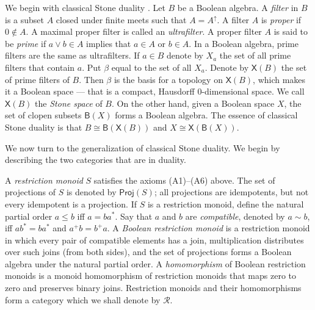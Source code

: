 \documentclass[a4paper]{amsart}
\begin{document}
We begin with classical Stone duality \cite{BS}.
Let $B$ be a Boolean algebra.
A {\em filter} in $B$ is a subset $A$ closed under finite meets such that $A = A^{\uparrow}$.
A filter $A$ is {\em proper} if $0 \notin A$.
A maximal proper filter is called an {\em ultrafilter}.
A proper filter $A$ is said to be {\em prime} if $a \vee b \in A$ implies that $a \in A$ or $b \in A$.
In a Boolean algebra, prime filters are the same as ultrafilters.
If $a \in B$ denote by $X_{a}$ the set of all prime filters that contain $a$.
Put $\beta$ equal to the set of all $X_{a}$.
Denote by $\mathsf{X}(B)$ the set of prime filters of $B$.
Then $\beta$ is the basis for a topology on $\mathsf{X}(B)$,
which makes it a Boolean space --- that is a compact, Hausdorff $0$-dimensional space.
We call $\mathsf{X}(B)$ the {\em Stone space} of $B$.
On the other hand, given a Boolean space $X$, the set of clopen subsets $\mathsf{B}(X)$ forms a Boolean algebra.
The essence of classical Stone duality is that $B \cong \mathsf{B}(\mathsf{X}(B))$ and $X \cong \mathsf{X}(\mathsf{B}(X))$.

We now turn to the generalization of classical Stone duality.
We begin by describing the two categories that are in duality.

A {\em restriction monoid} $S$ satisfies the axioms (A1)--(A6) above.
The set of projections of $S$ is denoted by $\mathsf{Proj}(S)$;
all projections are idempotents, but not every idempotent is a projection.
If $S$ is a restriction monoid, define the natural partial order $a \leq b$ iff $a = ba^{\ast}$.
Say that $a$ and $b$ are {\em compatible}, denoted by $a \sim b$, iff $ab^{\ast} = ba^{\ast}$ and $a^{+}b = b^{+}a$.
A {\em Boolean restriction monoid} is a restriction monoid in which every pair of compatible elements has a join,
multiplication distributes over such joins (from both sides),
and the set of projections forms a Boolean algebra under the natural partial order.
A {\em homomorphism} of Boolean restriction monoids is a monoid homomorphism of restriction monoids that maps zero to zero
and preserves binary joins.
Restriction monoids and their homomorphisms form a category which we shall denote by $\mathscr{R}$.
\end{document}
